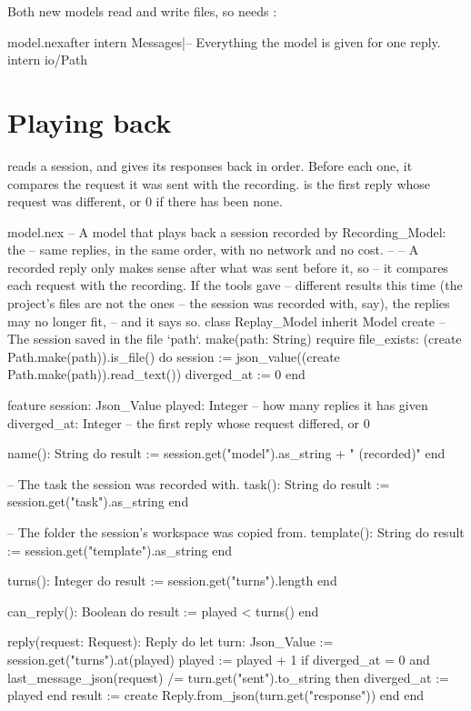 Both new models read and write files, so  needs
:

\begin{tightaddbefore}{model.nex}{after intern Messages}{|-- Everything the model is given for one reply.}
intern io/Path
\end{tightaddbefore}

\section{Playing back}

 reads a session, and gives its responses back in order.
Before each one, it compares the request it was sent with the recording.
 is the first reply whose request was different, or 0 if
there has been none.

\begin{append}{model.nex}
-- A model that plays back a session recorded by Recording_Model: the
-- same replies, in the same order, with no network and no cost.
--
-- A recorded reply only makes sense after what was sent before it, so
-- it compares each request with the recording. If the tools gave
-- different results this time (the project's files are not the ones
-- the session was recorded with, say), the replies may no longer fit,
-- and it says so.
class Replay_Model inherit Model
create
  -- The session saved in the file `path`.
  make(path: String)
  require
    file_exists: (create Path.make(path)).is_file()
  do
    session := json_value((create Path.make(path)).read_text())
    diverged_at := 0
  end

feature
  session: Json_Value
  played: Integer        -- how many replies it has given
  diverged_at: Integer   -- the first reply whose request differed, or 0

  name(): String do
    result := session.get("model").as_string + " (recorded)"
  end

  -- The task the session was recorded with.
  task(): String do
    result := session.get("task").as_string
  end

  -- The folder the session's workspace was copied from.
  template(): String do
    result := session.get("template").as_string
  end

  turns(): Integer do
    result := session.get("turns").length
  end

  can_reply(): Boolean do
    result := played < turns()
  end

  reply(request: Request): Reply do
    let turn: Json_Value := session.get("turns").at(played)
    played := played + 1
    if diverged_at = 0 and last_message_json(request) /= turn.get("sent").to_string then
      diverged_at := played
    end
    result := create Reply.from_json(turn.get("response"))
  end
end
\end{append}

